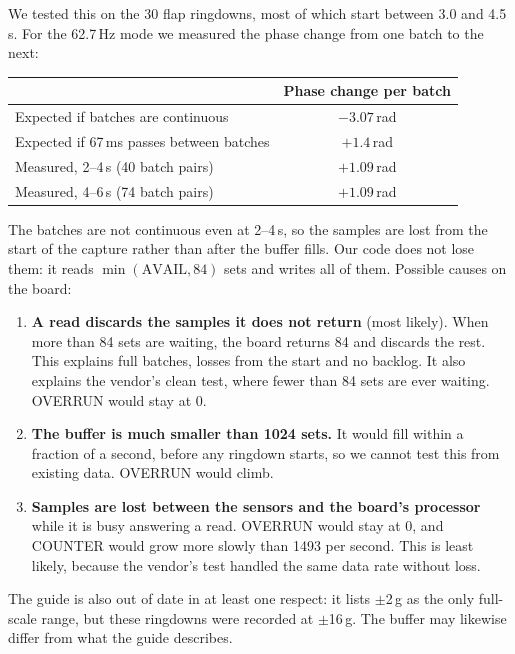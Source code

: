 \documentclass[11pt]{article}
\begin{document}
We tested this on the 30 flap ringdowns, most of which start between 3.0
and 4.5\,s. For the 62.7\,Hz mode we measured the phase change from one batch
to the next:

\begin{center}
\begin{tabular}{lc}
  \toprule
  & Phase change per batch \\
  \midrule
  Expected if batches are continuous & $-3.07$\,rad \\
  Expected if 67\,ms passes between batches & $+1.4$\,rad \\
  Measured, 2--4\,s (40 batch pairs) & $+1.09$\,rad \\
  Measured, 4--6\,s (74 batch pairs) & $+1.09$\,rad \\
  \bottomrule
\end{tabular}
\end{center}

The batches are not continuous even at 2--4\,s, so the samples are lost
from the start of the capture rather than after the buffer fills. Our
code does not lose them: it reads $\min(\text{AVAIL}, 84)$ sets and writes
all of them. Possible causes on the board:

\begin{enumerate}
  \item \textbf{A read discards the samples it does not return} (most
        likely). When more than 84 sets are waiting, the board returns 84 and
        discards the rest. This explains full batches, losses from the start
        and no backlog. It also explains the vendor's clean test, where fewer
        than 84 sets are ever waiting. OVERRUN would stay at 0.
  \item \textbf{The buffer is much smaller than 1024 sets.} It would fill
        within a fraction of a second, before any ringdown starts, so we
        cannot test this from existing data. OVERRUN would climb.
  \item \textbf{Samples are lost between the sensors and the board's
        processor} while it is busy answering a read. OVERRUN would stay at 0,
        and COUNTER would grow more slowly than 1493 per second. This is
        least likely, because the vendor's test handled the same data rate
        without loss.
\end{enumerate}

The guide is also out of date in at least one respect: it lists $\pm$2\,g
as the only full-scale range, but these ringdowns were recorded at
$\pm$16\,g. The buffer may likewise differ from what the guide describes.
\end{document}
